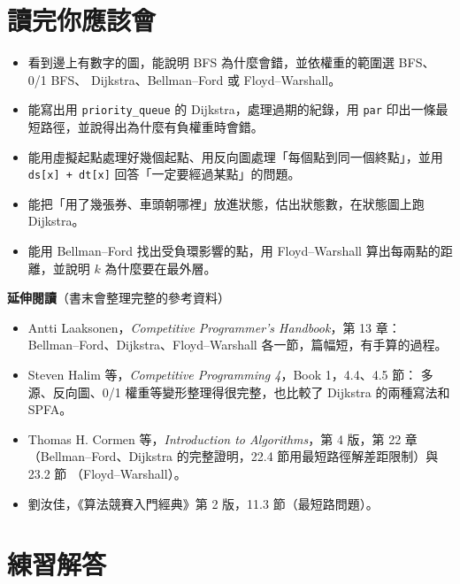 \section{讀完你應該會}
\label{sec:ch8-checklist}

\begin{itemize}
\item 看到邊上有數字的圖，能說明 BFS 為什麼會錯，並依權重的範圍選 BFS、0/1 BFS、
Dijkstra、Bellman--Ford 或 Floyd--Warshall。
\item 能寫出用 \texttt{priority\_queue} 的 Dijkstra，處理過期的紀錄，用
\texttt{par} 印出一條最短路徑，並說得出為什麼有負權重時會錯。
\item 能用虛擬起點處理好幾個起點、用反向圖處理「每個點到同一個終點」，並用
\texttt{ds[x] + dt[x]} 回答「一定要經過某點」的問題。
\item 能把「用了幾張券、車頭朝哪裡」放進狀態，估出狀態數，在狀態圖上跑
Dijkstra。
\item 能用 Bellman--Ford 找出受負環影響的點，用 Floyd--Warshall 算出每兩點的距
離，並說明 $k$ 為什麼要在最外層。
\end{itemize}

\textbf{延伸閱讀}（書末會整理完整的參考資料）

\begin{itemize}
\item Antti Laaksonen，\textit{Competitive Programmer's Handbook}，第 13 章：
Bellman--Ford、Dijkstra、Floyd--Warshall 各一節，篇幅短，有手算的過程。
\item Steven Halim 等，\textit{Competitive Programming 4}，Book 1，4.4、4.5 節：
多源、反向圖、0/1 權重等變形整理得很完整，也比較了 Dijkstra 的兩種寫法和 SPFA。
\item Thomas H. Cormen 等，\textit{Introduction to Algorithms}，第 4 版，第 22
章（Bellman--Ford、Dijkstra 的完整證明，22.4 節用最短路徑解差距限制）與 23.2 節
（Floyd--Warshall）。
\item 劉汝佳，《算法競賽入門經典》第 2 版，11.3 節（最短路問題）。
\end{itemize}

\section*{練習解答}

